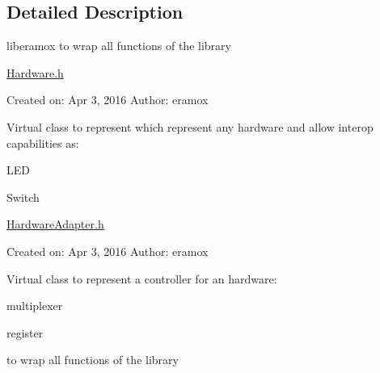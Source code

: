 \subsection{Detailed Description}
liberamox to wrap all functions of the library

\hyperlink{Hardware_8h_source}{Hardware.\+h}

Created on\+: Apr 3, 2016 Author\+: eramox

Virtual class to represent which represent any hardware and allow interop capabilities as\+:
\begin{DoxyItemize}
\item L\+ED
\item Switch
\end{DoxyItemize}

\hyperlink{HardwareAdapter_8h_source}{Hardware\+Adapter.\+h}

Created on\+: Apr 3, 2016 Author\+: eramox

Virtual class to represent a controller for an hardware\+:
\begin{DoxyItemize}
\item multiplexer
\item register

to wrap all functions of the library 
\end{DoxyItemize}
